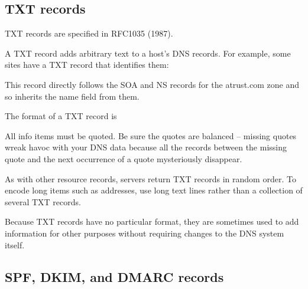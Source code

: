 \protect\hypertarget{part0024_split_030.html}{}{}

\hypertarget{part0024_split_030.htmlux5cux23_idContainer1069}{}
\hypertarget{part0024_split_030.htmlux5cux23calibre_pb_29}{%
\subsection[TXT
records]{\texorpdfstring{\protect\hypertarget{part0024_split_030.htmlux5cux23_idTextAnchor888}{}{}\protect\hypertarget{part0024_split_030.htmlux5cux23_idIndexMarker2103}{}{}TXT
records}{TXT records}}\label{part0024_split_030.htmlux5cux23calibre_pb_29}}

\leavevmode\hypertarget{part0024_split_030.htmlux5cux23_idContainer965}{}%
TXT records are specified in RFC1035 (1987).

A TXT record adds
\protect\hypertarget{part0024_split_030.htmlux5cux23_idIndexMarker2104}{}{}arbitrary
text to a host's DNS records. For example, some sites have a TXT record
that identifies them:


This record directly follows the SOA and NS records for the atrust.com
zone and so inherits the {name} field from them.

The format of a TXT record is


All {info} items must be quoted. Be sure the quotes are
balanced -- missing quotes wreak havoc with your DNS data because all the
records between the missing quote and the next occurrence of a quote
mysteriously disappear.

As with other resource records, servers return TXT records in random
order. To encode long items such as addresses, use long text lines
rather than a collection of several TXT records.

Because TXT records have no particular format, they are sometimes used
to add information for other purposes without requiring changes to the
DNS system itself.

\protect\hypertarget{part0024_split_031.html}{}{}

\hypertarget{part0024_split_031.htmlux5cux23_idContainer1069}{}
\hypertarget{part0024_split_031.htmlux5cux23calibre_pb_30}{%
\subsection[SPF, DKIM, and DMARC
records]{\texorpdfstring{\protect\hypertarget{part0024_split_031.htmlux5cux23_idTextAnchor889}{}{}\protect\hypertarget{part0024_split_031.htmlux5cux23_idIndexMarker2105}{}{}\protect\hypertarget{part0024_split_031.htmlux5cux23_idTextAnchor890}{}{}SPF,
\protect\hypertarget{part0024_split_031.htmlux5cux23_idIndexMarker2106}{}{}DKIM,
and
\protect\hypertarget{part0024_split_031.htmlux5cux23_idIndexMarker2107}{}{}DMARC
records}{SPF, DKIM, and DMARC records}}\label{part0024_split_031.htmlux5cux23calibre_pb_30}}


